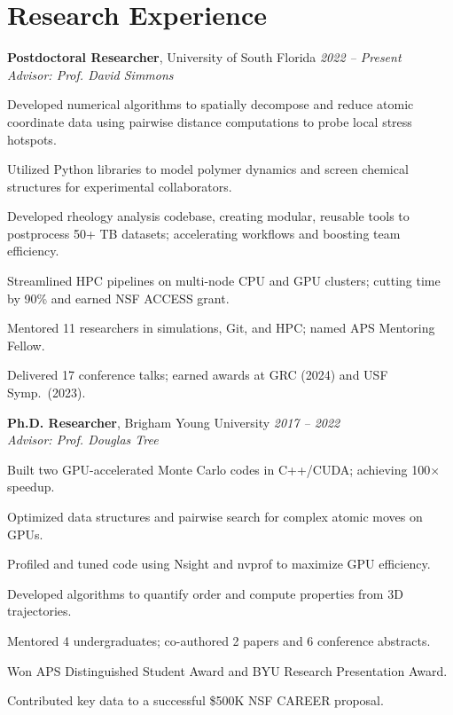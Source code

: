 \section*{Research Experience}
\textbf{Postdoctoral Researcher}, University of South Florida \hfill \textit{2022 – Present} \\
\textit{Advisor: Prof. David Simmons}
\begin{tabitemize}[leftmargin=*]
  \item Developed numerical algorithms to spatially decompose and reduce atomic coordinate data using pairwise distance computations to probe local stress hotspots.
  \item Utilized Python libraries to model polymer dynamics and screen chemical structures for experimental collaborators.
  \item Developed rheology analysis codebase, creating modular, reusable tools to postprocess 50+ TB datasets; accelerating workflows and boosting team efficiency.
  \item Streamlined HPC pipelines on multi-node CPU and GPU clusters; cutting time by 90\% and earned NSF ACCESS grant.
  \item Mentored 11 researchers in simulations, Git, and HPC; named APS Mentoring Fellow.
  \item Delivered 17 conference talks; earned awards at GRC (2024) and USF Symp.~(2023).
\end{tabitemize}
\textbf{Ph.D. Researcher}, Brigham Young University \hfill \textit{2017 – 2022} \\
\textit{Advisor: Prof. Douglas Tree}
\begin{tabitemize}[leftmargin=*]
  \item Built two GPU-accelerated Monte Carlo codes in C++/CUDA; achieving 100$\times$ speedup.
  \item Optimized data structures and pairwise search for complex atomic moves on GPUs.
  \item Profiled and tuned code using Nsight and nvprof to maximize GPU efficiency.
  \item Developed algorithms to quantify order and compute properties from 3D trajectories.
  \item Mentored 4 undergraduates; co-authored 2 papers and 6 conference abstracts.%
  \item Won APS Distinguished Student Award and BYU Research Presentation Award.
  \item Contributed key data to a successful \$500K NSF CAREER proposal.
\end{tabitemize}
